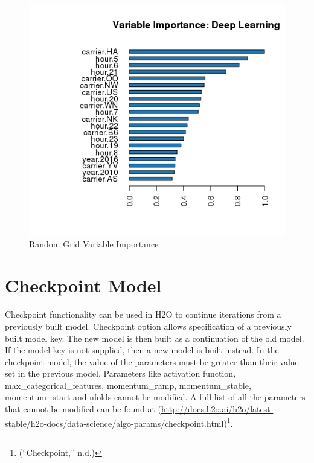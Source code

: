 \documentclass[12pt,twoside]{amherstthesis}
\begin{document}
  \begin{figure}[htbp]
  \centering
  \includegraphics[scale = 1,angle = 0]{figure/VarGridRandom.png}
  \caption[Random Grid Variable Importance]{\normalsize{Random Grid Variable Importance}}
  \label{fig:Hyarn139}
  \end{figure}
  
  \clearpage 
  
  \section{Checkpoint Model}\label{checkpoint-model}
  
  Checkpoint functionality can be used in H2O to continue iterations from
  a previously built model. Checkpoint option allows specification of a
  previously built model key. The new model is then built as a
  continuation of the old model. If the model key is not supplied, then a
  new model is built instead. In the checkpoint model, the value of the
  parameters must be greater than their value set in the previous model.
  Parameters like activation function, max\_categorical\_features,
  momentum\_ramp, momentum\_stable, momentum\_start and nfolds cannot be
  modified. A full list of all the parameters that cannot be modified can
  be found at
  (\url{http://docs.h2o.ai/h2o/latest-stable/h2o-docs/data-science/algo-params/checkpoint.html})\footnote{(``Checkpoint,''
    n.d.)}.
  
\end{document}
